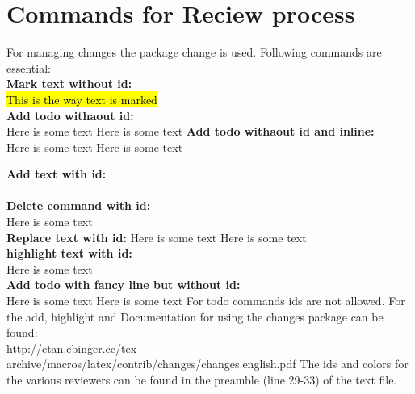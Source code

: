 \chapter{Commands for Reciew process}

For managing changes the package change is used. Following commands are essential:\\
\textbf{Mark text without id:}\\
\hl{
	This is the way  text is marked
}\\

\textbf{Add todo withaout id:}\\
Here is some text
 Here is some text
\newline
\newline
\newline
\newline
\textbf{Add todo withaout id and inline:}\\
Here is some text
 Here is some text
\newline

\textbf{Add text with id:}\\
\\

\textbf{Delete command with id:}\\
Here is some text\\
\newline
\textbf{Replace text with id:}\newline
Here is some text
Here is some text\\

\textbf{highlight text with id:}\\
Here is some text
\\

\textbf{Add todo with fancy line but without id:}\\
Here is some text 
 Here is some text
\newline 
\newline
\newline
\newline 
\newline
\newline
For todo commands ids are not allowed. For the add, highlight and
Documentation for using the changes package can be found:\\
http://ctan.ebinger.cc/tex-archive/macros/latex/contrib/changes/changes.english.pdf
\newline
The ids and colors for the various reviewers can be found in the preamble (line 29-33) of the text file.

